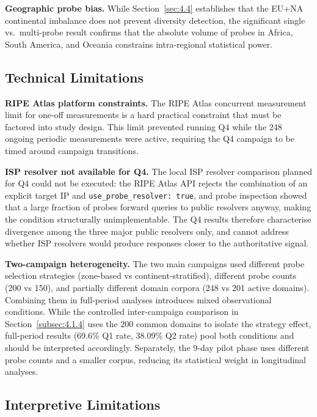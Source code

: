\textbf{Geographic probe bias.} While Section~\ref{sec:4.4} establishes that the EU+NA continental imbalance does not prevent diversity detection, the significant single vs.\ multi-probe result confirms that the absolute volume of probes in Africa, South America, and Oceania constrains intra-regional statistical power.

\bigskip
\subsection{Technical Limitations}
\label{subsec:5.2.2}

\textbf{RIPE Atlas platform constraints.} The RIPE Atlas concurrent measurement limit for one-off measurements is a hard practical constraint that must be factored into study design. This limit prevented running Q4 while the 248 ongoing periodic measurements were active, requiring the Q4 campaign to be timed around campaign transitions.

\textbf{\ac{ISP} resolver not available for Q4.} The local \ac{ISP} resolver comparison planned for Q4 could not be executed: the RIPE Atlas \ac{API} rejects the combination of an explicit target \ac{IP} and \texttt{use\_probe\_resolver: true}, and probe inspection showed that a large fraction of probes forward queries to public resolvers anyway, making the condition structurally unimplementable. The Q4 results therefore characterise divergence among the three major public resolvers only, and cannot address whether \ac{ISP} resolvers would produce responses closer to the authoritative signal.

\textbf{Two-campaign heterogeneity.} The two main campaigns used different probe selection strategies (zone-based vs continent-stratified), different probe counts (200 vs 150), and partially different domain corpora (248 vs 201 active domains). Combining them in full-period analyses introduces mixed observational conditions. While the controlled inter-campaign comparison in Section~\ref{subsec:4.1.4} uses the 200 common domains to isolate the strategy effect, full-period results (69.6\% Q1 rate, 38.09\% Q2 rate) pool both conditions and should be interpreted accordingly. Separately, the 9-day pilot phase uses different probe counts and a smaller corpus, reducing its statistical weight in longitudinal analyses.

\bigskip
\subsection{Interpretive Limitations}
\label{subsec:5.2.3}

